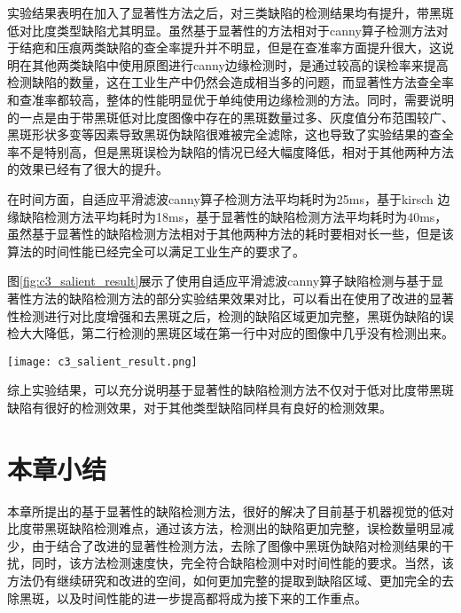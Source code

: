         实验结果表明在加入了显著性方法之后，对三类缺陷的检测结果均有提升，带黑斑低对比度类型缺陷尤其明显。虽然基于显著性的方法相对于canny算子检测方法对于结疤和压痕两类缺陷的查全率提升并不明显，但是在查准率方面提升很大，这说明在其他两类缺陷中使用原图进行canny边缘检测时，是通过较高的误检率来提高检测缺陷的数量，这在工业生产中仍然会造成相当多的问题，而显著性方法查全率和查准率都较高，整体的性能明显优于单纯使用边缘检测的方法。同时，需要说明的一点是由于带黑斑低对比度图像中存在的黑斑数量过多、灰度值分布范围较广、黑斑形状多变等因素导致黑斑伪缺陷很难被完全滤除，这也导致了实验结果的查全率不是特别高，但是黑斑误检为缺陷的情况已经大幅度降低，相对于其他两种方法的效果已经有了很大的提升。

        在时间方面，自适应平滑滤波canny算子检测方法平均耗时为25ms，基于kirsch 边缘缺陷检测方法平均耗时为18ms，基于显著性的缺陷检测方法平均耗时为40ms，虽然基于显著性的缺陷检测方法相对于其他两种方法的耗时要相对长一些，但是该算法的时间性能已经完全可以满足工业生产的要求了。

        图\ref{fig:c3_salient_result}展示了使用自适应平滑滤波canny算子缺陷检测与基于显著性方法的缺陷检测方法的部分实验结果效果对比，可以看出在使用了改进的显著性检测进行对比度增强和去黑斑之后，检测的缺陷区域更加完整，黑斑伪缺陷的误检大大降低，第二行检测的黑斑区域在第一行中对应的图像中几乎没有检测出来。

        \begin{figure*}[!h]
        \centering
        \texttt{[image: c3\_salient\_result.png]}
        \caption{部分检测结果，从上之下依次为基于显著性图的方法和canny算子检测的实验结果}
        \label{fig:c3_salient_result}
        \end{figure*}

        综上实验结果，可以充分说明基于显著性的缺陷检测方法不仅对于低对比度带黑斑缺陷有很好的检测效果，对于其他类型缺陷同样具有良好的检测效果。
    \section{本章小结}
    本章所提出的基于显著性的缺陷检测方法，很好的解决了目前基于机器视觉的低对比度带黑斑缺陷检测难点，通过该方法，检测出的缺陷更加完整，误检数量明显减少，由于结合了改进的显著性检测方法，去除了图像中黑斑伪缺陷对检测结果的干扰，同时，该方法检测速度快，完全符合缺陷检测中对时间性能的要求。当然，该方法仍有继续研究和改进的空间，如何更加完整的提取到缺陷区域、更加完全的去除黑斑，以及时间性能的进一步提高都将成为接下来的工作重点。

